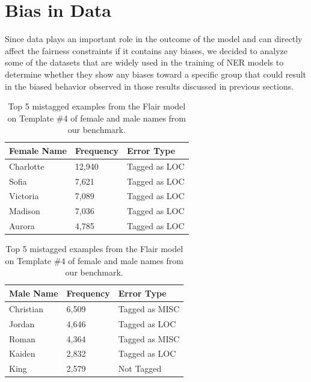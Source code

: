 \section{Bias in Data}
Since data plays an important role in the outcome of the model and can directly affect the fairness constraints if it contains any biases, we decided to analyze some of the datasets that are widely used in the training of NER models to determine whether they show any biases toward a specific group that could result in the biased behavior observed in those results discussed in previous sections. 
\begin{table}
\begin{tabular}{ p{2.6cm}p{1.4cm}p{2.4cm}}
 \toprule
 Female Name&Frequency&Error Type\\
 \midrule
 Charlotte&12,940&Tagged as LOC\\[0.5pt]
 Sofia&7,621&Tagged as LOC\\[0.5pt]
 Victoria&7,089&Tagged as LOC\\[0.5pt]
 Madison&7,036&Tagged as LOC\\[0.5pt]
 Aurora&4,785&Tagged as LOC\\[0.5pt]
 \bottomrule
\end{tabular}
\newline
\vspace*{0.3 cm}
\newline
\begin{tabular}{ p{2.6cm}p{1.4cm}p{2.4cm}}
 \toprule
 Male Name&Frequency&Error Type\\
 \midrule
 Christian&6,509&Tagged as MISC\\[0.5pt]
 Jordan&4,646&Tagged as LOC\\[0.5pt]
 Roman&4,364&Tagged as MISC\\[0.5pt]
 Kaiden&2,832&Tagged as LOC\\[0.5pt]
 King&2,579&Not Tagged\\[0.5pt]
 \bottomrule
\end{tabular}
\caption{Top 5 mistagged examples from the Flair model on Template \#4 of female and male names from our benchmark.}

\label{examples}
\end{table}
